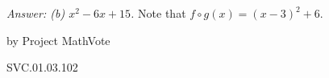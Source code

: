 
{\it Answer: (b) $x^2-6x+15$.} Note that $f\circ g(x)=(x-3)^2+6$.

\medskip
by Project MathVote

SVC.01.03.102

